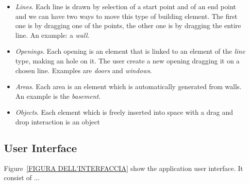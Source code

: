 \begin{itemize}
\item \emph{Lines}. Each line is drawn by selection of a start point and of an end point and we can have two ways to move this type of building element. The first one is by dragging one of the points, the other one is by dragging the entire line. An example: a \emph{wall}.

\item \emph{Openings}. Each opening is an element that is linked to an element of the \emph{line} type, making an hole on it. The user create a new opening dragging it on a chosen line. Examples are \emph{doors} and \emph{windows}.

\item \emph{Areas}. Each area is an element which is automatically generated from walls. An example is the \emph{basement}.

\item \emph{Objects}. Each element which is freely inserted into space with a drag and drop interaction is an object
\end{itemize}

\subsection{User Interface}\label{ssec:ui}

Figure~\ref{FIGURA DELL'INTERFACCIA} show the application user interface. It consist of ...

